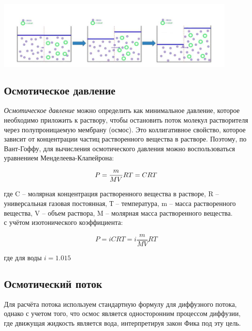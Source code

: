 \documentclass{article}
\begin{document}
            \includegraphics[width=0.9\textwidth]{Osmos.png}
        
        \newpage
        \subsection*{Осмотическое давление}
            \hspace*{4mm}\textit{Осмотическое давление} можно определить как минимальное давление, которое необходимо
            приложить к раствору, чтобы остановить поток молекул растворителя через
            полупроницаемую мембрану (осмос). Это коллигативное свойство, которое
            зависит от концентрации частиц растворенного вещества в растворе. Поэтому, по
            Вант-Гоффу, для вычисления осмотического давления можно воспользоваться
            уравнением Менделеева-Клапейрона:

            \begin{equation}
                P = \frac{m}{MV} \* RT = CRT    
            \end{equation}
            
            где C – молярная концентрация растворенного вещества в растворе, R –
            универсальная газовая постоянная, Т – температура, m – масса растворенного
            вещества, V – объем раствора, M – молярная масса растворенного вещества. \\

            с учётом изотонического коэффициента: 

            \begin{equation}
                P = iCRT = i\frac{m}{MV}RT
            \end{equation}

            где для воды $i = 1.015$

        \subsection*{Осмотический поток}
            \hspace*{4mm}Для расчёта потока используем стандартную формулу для диффузного потока, однако с учетом того, что осмос
            является односторонним процессом диффузии, где движущая жидкость является
            вода, интерпретируя закон Фика под эту цель.
\end{document}
